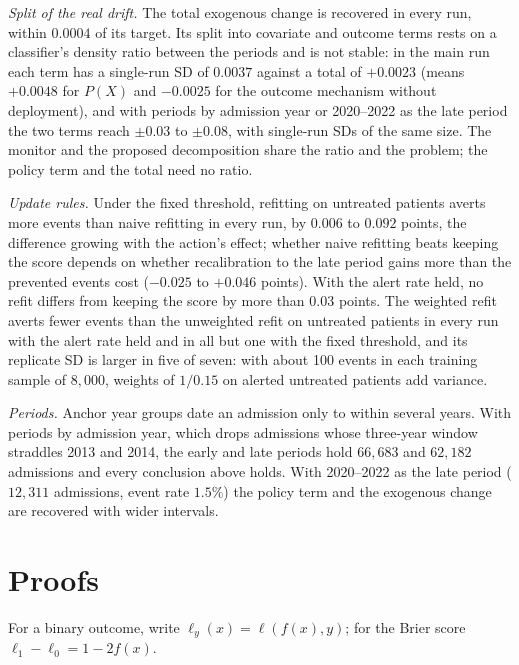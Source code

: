 \documentclass[letterpaper]{article} %
\begin{document}
\emph{Split of the real drift.} The total exogenous change is recovered in
every run, within $0.0004$ of its target. Its split into covariate and outcome
terms rests on a classifier's density ratio between the periods and is not
stable: in the main run each term has a single-run SD of $0.0037$ against a
total of $+0.0023$ (means $+0.0048$ for $P(X)$ and $-0.0025$ for the outcome
mechanism without deployment), and with periods by admission year or
2020--2022 as the late period the two terms reach $\pm 0.03$ to $\pm 0.08$,
with single-run SDs of the same size. The monitor and the proposed
decomposition share the ratio and the problem; the policy term and the total
need no ratio.

\emph{Update rules.} Under the fixed threshold, refitting on untreated
patients averts more events than naive refitting in every run, by $0.006$ to
$0.092$ points, the difference growing with the action's effect; whether naive
refitting beats keeping the score depends on whether recalibration to the late
period gains more than the prevented events cost ($-0.025$ to $+0.046$
points). With the alert rate held, no refit differs from keeping the score by
more than $0.03$ points. The weighted refit averts fewer events than the
unweighted refit on untreated patients in every run with the alert rate held
and in all but one with the fixed threshold, and its replicate SD is larger in
five of seven: with about 100 events in each training sample of $8{,}000$,
weights of $1/0.15$ on alerted untreated patients add variance.

\emph{Periods.} Anchor year groups date an admission only to within several
years. With periods by admission year, which drops admissions whose
three-year window straddles 2013 and 2014, the early and late periods hold
$66{,}683$ and $62{,}182$ admissions and every conclusion above holds. With
2020--2022 as the late period ($12{,}311$ admissions, event rate $1.5\%$) the
policy term and the exogenous change are recovered with wider intervals.


\section{Proofs}
For a binary outcome, write $\ell_y(x) = \ell(f(x), y)$; for the Brier score
$\ell_1 - \ell_0 = 1 - 2f(x)$.
\end{document}
